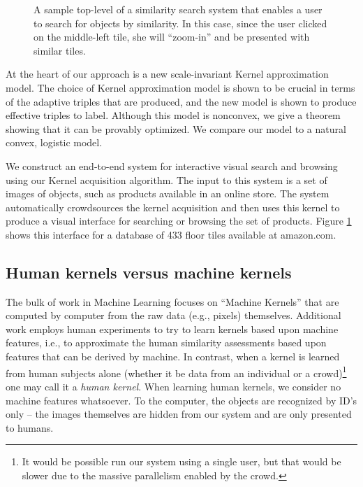 \documentclass{article}
\begin{document}
\begin{figure}
 \caption{\label{fig:tilestree} A sample top-level of a similarity search system that enables a user to search for objects by similarity.  In this case, since the user clicked on the middle-left tile, she will ``zoom-in'' and be presented with similar tiles.}
\end{figure}

At the heart of our approach is a new scale-invariant Kernel approximation model.  The choice of Kernel approximation model is shown to be crucial in terms of the adaptive triples that are produced, and the new model is shown to produce effective triples to label.  Although this model is nonconvex, we give a theorem showing that it can be provably optimized.  We compare our model to a natural convex, logistic model.

We construct an end-to-end system for interactive visual search and
browsing using our Kernel acquisition algorithm. The input to this
system is a set of images of objects, such as products available in an
online store. The system automatically crowdsources the kernel
acquisition and then uses this kernel to produce a visual interface
for searching or browsing the set of products. Figure
\ref{fig:tilestree} shows this interface for a database of 433 floor
tiles available at amazon.com.

\subsection{Human kernels versus machine kernels}
The bulk of work in Machine Learning focuses on ``Machine Kernels''
that are computed by computer from the raw data (e.g., pixels)
themselves.  Additional work employs human experiments to try to learn
kernels based upon machine features, i.e., to approximate the human
similarity assessments based upon features that can be derived by
machine.  In contrast, when a kernel is learned from human subjects
alone (whether it be data from an individual or a crowd)\footnote{It
  would be possible run our system using a single user, but that would
  be slower due to the massive parallelism enabled by the crowd.} one
may call it a {\em human kernel}.  When learning human kernels, we
consider no machine features whatsoever. To the computer, the objects
are recognized by ID's only -- the images themselves are hidden from
our system and are only presented to humans.
\end{document}

